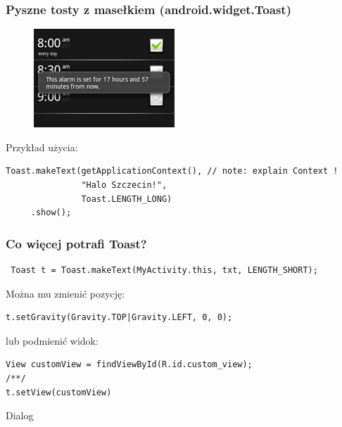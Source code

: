 \begin{frame}[fragile]\frametitle{Pyszne tosty z masełkiem (android.widget.Toast)}

\begin{figure}[h]
 \centering
 \includegraphics[height=0.40\textheight,keepaspectratio=true]{images/toast}
\end{figure}

 Przykład użycia: 
 \begin{lstlisting}
Toast.makeText(getApplicationContext(), // note: explain Context !
               "Halo Szczecin!", 
               Toast.LENGTH_LONG)
     .show();
 \end{lstlisting}

\end{frame}

\begin{frame}[fragile]
\frametitle{Co więcej potrafi Toast?}
\begin{lstlisting}
 Toast t = Toast.makeText(MyActivity.this, txt, LENGTH_SHORT);
\end{lstlisting}

\pause

Można mu zmienić pozycję:
\begin{lstlisting}
t.setGravity(Gravity.TOP|Gravity.LEFT, 0, 0);
\end{lstlisting}

\pause

lub podmienić widok:
\begin{lstlisting}
View customView = findViewById(R.id.custom_view);
/**/
t.setView(customView)
 \end{lstlisting}

\end{frame}

\begin{frame}
 \begin{center}
  \Huge{Dialog}
 \end{center}
\end{frame}



